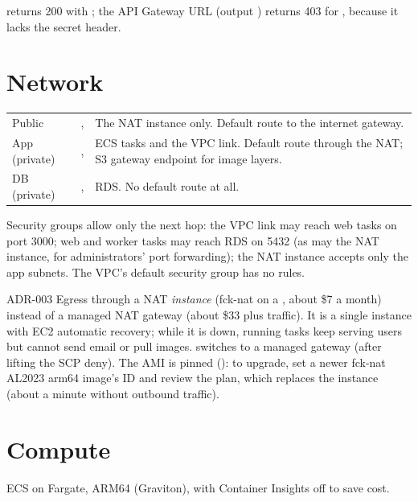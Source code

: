 \begin{auditnote}
   returns 200 with
  ; the API Gateway URL (output ) returns 403
  for , because it lacks the secret header.
\end{auditnote}

\section{Network}
\begin{xltabular}{\linewidth}{@{}P{30mm} P{34mm} L@{}}
  \toprule
   &  & \\
  \midrule
  Public & ,  & The NAT instance only. Default route to the internet gateway.\\
  App (private) & ,  & ECS tasks and the VPC link. Default route through the NAT; S3 gateway endpoint for image layers.\\
  DB (private) & ,  & RDS. No default route at all.\\
  \bottomrule
\end{xltabular}

Security groups allow only the next hop: the VPC link may reach web tasks on port 3000; web and
worker tasks may reach RDS on 5432 (as may the NAT instance, for administrators' port forwarding);
the NAT instance accepts only the app subnets. The VPC's default security group has no rules.

\begin{decision}{ADR-003}
  Egress through a NAT \emph{instance} (fck-nat on a , about \$7 a month) instead of a
  managed NAT gateway (about \$33 plus traffic). It is a single instance with EC2 automatic
  recovery; while it is down, running tasks keep serving users but cannot send email or pull
  images.  switches to a managed gateway (after lifting the SCP deny).
  The AMI is pinned (): to upgrade, set a newer fck-nat AL2023 arm64 image's ID
  and review the plan, which replaces the instance (about a minute without outbound traffic).
\end{decision}

\section{Compute}\label{sec:aws-compute}
ECS on Fargate, ARM64 (Graviton), with Container Insights off to save cost.

